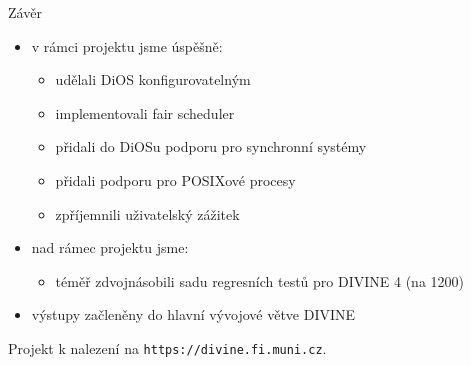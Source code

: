 \documentclass[large,ignorenonframetext,aspectratio=169,]{paradise-slide}
\providecommand{\tightlist}{%
  \setlength{\itemsep}{0pt}\setlength{\parskip}{0pt}}
\begin{document}
\begin{frame}[fragile]{Závěr}
\protect\hypertarget{zuxe1vux11br}{}

\begin{itemize}
\tightlist
\item
  v rámci projektu jsme úspěšně:

  \begin{itemize}
  \tightlist
  \item
    udělali DiOS konfigurovatelným
  \item
    implementovali fair scheduler
  \item
    přidali do DiOSu podporu pro synchronní systémy
  \item
    přidali podporu pro POSIXové procesy
  \item
    zpříjemnili uživatelský zážitek
  \end{itemize}
\item
  nad rámec projektu jsme:

  \begin{itemize}
  \tightlist
  \item
    téměř zdvojnásobili sadu regresních testů pro DIVINE 4 (na 1200)
  \end{itemize}
\item
  výstupy začleněny do hlavní vývojové větve DIVINE
\end{itemize}

Projekt k nalezení na \texttt{https://divine.fi.muni.cz}.

\end{frame}
\end{document}

